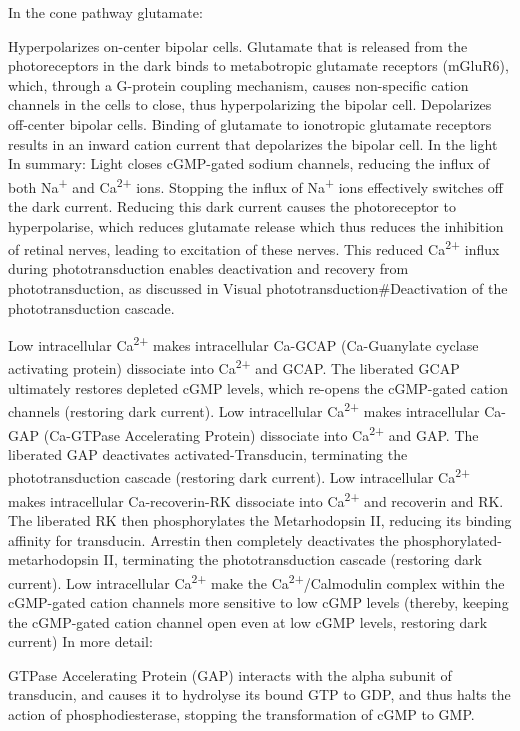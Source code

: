 \documentclass[]{book}
\begin{document}
In the cone pathway glutamate:

Hyperpolarizes on-center bipolar cells. Glutamate that is released from the photoreceptors in the dark binds to metabotropic glutamate receptors (mGluR6), which, through a G-protein coupling mechanism, causes non-specific cation channels in the cells to close, thus hyperpolarizing the bipolar cell.
Depolarizes off-center bipolar cells. Binding of glutamate to ionotropic glutamate receptors results in an inward cation current that depolarizes the bipolar cell.
In the light
In summary: Light closes cGMP-gated sodium channels, reducing the influx of both Na\textsuperscript{+} and Ca\textsuperscript{2+} ions. Stopping the influx of Na\textsuperscript{+} ions effectively switches off the dark current. Reducing this dark current causes the photoreceptor to hyperpolarise, which reduces glutamate release which thus reduces the inhibition of retinal nerves, leading to excitation of these nerves. This reduced Ca\textsuperscript{2+} influx during phototransduction enables deactivation and recovery from phototransduction, as discussed in Visual phototransduction\#Deactivation of the phototransduction cascade.

Low intracellular Ca\textsuperscript{2+} makes intracellular Ca-GCAP (Ca-Guanylate cyclase activating protein) dissociate into Ca\textsuperscript{2+} and GCAP. The liberated GCAP ultimately restores depleted cGMP levels, which re-opens the cGMP-gated cation channels (restoring dark current).
Low intracellular Ca\textsuperscript{2+} makes intracellular Ca-GAP (Ca-GTPase Accelerating Protein) dissociate into Ca\textsuperscript{2+} and GAP. The liberated GAP deactivates activated-Transducin, terminating the phototransduction cascade (restoring dark current).
Low intracellular Ca\textsuperscript{2+} makes intracellular Ca-recoverin-RK dissociate into Ca\textsuperscript{2+} and recoverin and RK. The liberated RK then phosphorylates the Metarhodopsin II, reducing its binding affinity for transducin. Arrestin then completely deactivates the phosphorylated-metarhodopsin II, terminating the phototransduction cascade (restoring dark current).
Low intracellular Ca\textsuperscript{2+} make the Ca\textsuperscript{2+}/Calmodulin complex within the cGMP-gated cation channels more sensitive to low cGMP levels (thereby, keeping the cGMP-gated cation channel open even at low cGMP levels, restoring dark current)
In more detail:

GTPase Accelerating Protein (GAP) interacts with the alpha subunit of transducin, and causes it to hydrolyse its bound GTP to GDP, and thus halts the action of phosphodiesterase, stopping the transformation of cGMP to GMP.
\end{document}

